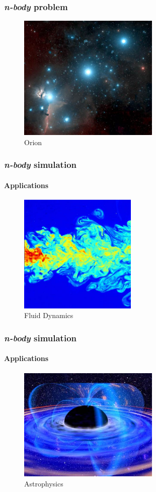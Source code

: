 \begin{frame}
\frametitle{\emph{n-body} problem}
    \begin{figure}[t]
        \centering
        \includegraphics[width=0.6\textwidth]{img/orion}
        \caption{Orion}
    \end{figure}
\end{frame}

\frame
{
\frametitle{\emph{n-body} simulation}
\framesubtitle{Applications}
\begin{figure}
    \centering
    \includegraphics[width=0.5\textwidth]{img/jet}
    \caption{Fluid Dynamics}
\end{figure}
}

\frame
{
\frametitle{\emph{n-body} simulation}
\framesubtitle{Applications}
\begin{figure}
    \centering
    \includegraphics[width=0.6\textwidth]{img/bh}
    \caption{Astrophysics}
\end{figure}
}

